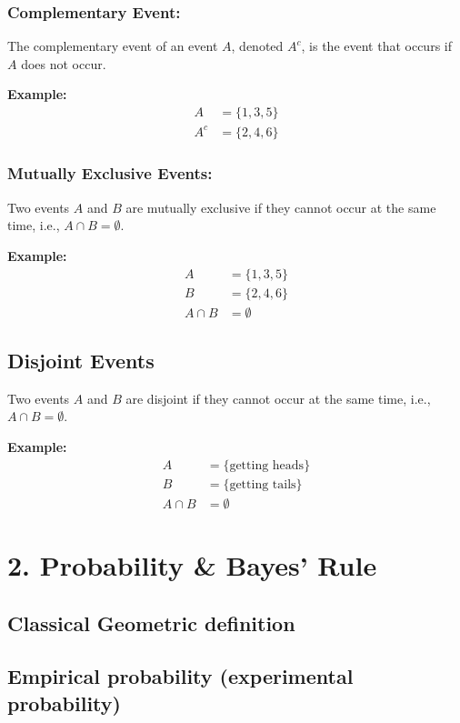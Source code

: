 \documentclass{article}
\begin{document}
\subsubsection*{Complementary Event:}
The complementary event of an event $A$, denoted $A^c$, is the event that occurs if $A$ does not occur.

\textbf{Example:}
\begin{align*}
    A &= \{1, 3, 5\} \\
    A^c &= \{2, 4, 6\}
\end{align*}


\subsubsection*{Mutually Exclusive Events:}
Two events $A$ and $B$ are mutually exclusive if they cannot occur at the same time, i.e., $A \cap B = \emptyset$.

\textbf{Example:}
\begin{align*}
    A &= \{1, 3, 5\} \\
    B &= \{2, 4, 6\} \\
    A \cap B &= \emptyset
\end{align*}

\subsection*{Disjoint Events}
Two events $A$ and $B$ are disjoint if they cannot occur at the same time, i.e., $A \cap B = \emptyset$.

\textbf{Example:}
\begin{align*}
    A &= \{\text{getting heads}\} \\
    B &= \{\text{getting tails}\} \\
    A \cap B &= \emptyset
\end{align*}


\section*{2. Probability \& Bayes' Rule}

\subsection*{Classical Geometric definition}

\subsection*{Empirical probability (experimental probability)}
\end{document}
